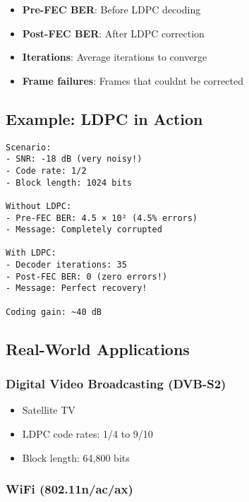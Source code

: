 \begin{itemize}
\tightlist
\item
  \textbf{Pre-FEC BER}: Before LDPC decoding
\item
  \textbf{Post-FEC BER}: After LDPC correction
\item
  \textbf{Iterations}: Average iterations to converge
\item
  \textbf{Frame failures}: Frames that couldn\textquotesingle t be
  corrected
\end{itemize}

\subsection{Example: LDPC in Action}\label{example-ldpc-in-action}

\begin{verbatim}
Scenario:
- SNR: -18 dB (very noisy!)
- Code rate: 1/2
- Block length: 1024 bits

Without LDPC:
- Pre-FEC BER: 4.5 × 10² (4.5% errors)
- Message: Completely corrupted 

With LDPC:
- Decoder iterations: 35
- Post-FEC BER: 0 (zero errors!)
- Message: Perfect recovery! 

Coding gain: ~40 dB
\end{verbatim}

\subsection{Real-World Applications}\label{real-world-applications}

\subsubsection{Digital Video Broadcasting
(DVB-S2)}\label{digital-video-broadcasting-dvb-s2}

\begin{itemize}
\tightlist
\item
  Satellite TV
\item
  LDPC code rates: 1/4 to 9/10
\item
  Block length: 64,800 bits
\end{itemize}

\subsubsection{WiFi (802.11n/ac/ax)}\label{wifi-802.11nacax}

